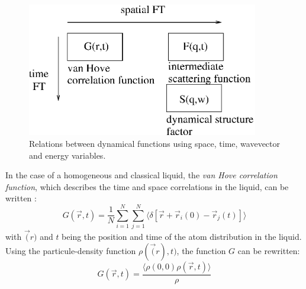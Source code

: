 \begin{figure}
  \begin{center}
    \includegraphics[width=0.9\textwidth]{figures/GFS.eps}
  \end{center}
\caption{Relations between dynamical functions using space, time, wavevector and energy variables.}
\label{f:GFS}
\end{figure}

In the case of a homogeneous and classical liquid, the \emph{van Hove correlation function}, which describes the time and space correlations in the liquid, can be written \cite{Egelstaff67,squires}:
\begin{equation} \label{eq:vanhove}
G(\vec{r},t) = \frac{1}{N} \sum_{i=1}^N \sum_{j=1}^N  \langle\delta[\vec{r} + \vec{r}_i(0) - \vec{r}_j(t)]\rangle
\end{equation}
with $\vec(r)$ and $t$ being the position and time of the atom distribution in the liquid.
Using the particule-density function $\rho(\vec(r),t)$, the function $G$ can be rewritten:
\begin{equation} \label{eq:vanhove-rho}
G(\vec{r},t) = \frac{\langle \rho(0,0) \rho(\vec{r},t)\rangle}{\rho}
\end{equation}

